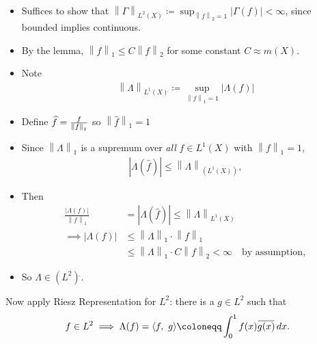 \begin{solution}
\begin{itemize}
\item
  Suffices to show that
  \({\left\lVert {\Gamma} \right\rVert}_{L^2(X) {}^{ \check{} }} \coloneqq\sup_{{\left\lVert {f} \right\rVert}_2 = 1} {\left\lvert {\Gamma(f)} \right\rvert} < \infty\),
  since bounded implies continuous.
\item
  By the lemma,
  \({\left\lVert {f} \right\rVert}_1 \leq C{\left\lVert {f} \right\rVert}_2\)
  for some constant \(C \approx m(X)\).
\item
  Note
  \begin{align*}{\left\lVert {\Lambda} \right\rVert}_{L^1(X) {}^{ \check{} }} \coloneqq\displaystyle\sup_{{\left\lVert {f} \right\rVert}_1 = 1} {\left\lvert {\Lambda(f)} \right\rvert}\end{align*}
\item
  Define \(\widehat{f} = {f\over {\left\lVert {f} \right\rVert}_1}\) so
  \({\left\lVert {\widehat{f}} \right\rVert}_1 = 1\)
\item
  Since \({\left\lVert {\Lambda} \right\rVert}_{1 {}^{ \check{} }}\) is
  a supremum over \emph{all} \(f \in L^1(X)\) with
  \({\left\lVert {f} \right\rVert}_1 =1\),
  \begin{align*}
  {\left\lvert {\Lambda(\widehat{f})} \right\rvert} \leq {\left\lVert {\Lambda} \right\rVert}_{(L^1(X)) {}^{ \check{} }}
  ,\end{align*}
\item
  Then
  \begin{align*}
  \frac{{\left\lvert {\Lambda(f)} \right\rvert}}{{\left\lVert {f} \right\rVert}_1} &= {\left\lvert {\Lambda(\widehat{f})} \right\rvert} \leq {\left\lVert {\Lambda} \right\rVert}_{L^1(X) {}^{ \check{} }} \\
  \implies {\left\lvert {\Lambda(f)} \right\rvert} 
  &\leq {\left\lVert {\Lambda} \right\rVert}_{1 {}^{ \check{} }} \cdot {\left\lVert {f} \right\rVert}_1 \\
  &\leq {\left\lVert {\Lambda} \right\rVert}_{1 {}^{ \check{} }} \cdot C {\left\lVert {f} \right\rVert}_2 < \infty \quad\text{by assumption}
  ,\end{align*}
\item
  So \(\Lambda \in (L^2) {}^{ \check{} }\).
\end{itemize}

Now apply Riesz Representation for \(L^2\): there is a \(g \in L^2\)
such that
\begin{align*}f\in L^2 \implies \Lambda(f) = {\left\langle {f},~{g} \right\rangle} \coloneqq\int_0^1 f(x) \mkern 1.5mu\overline{\mkern-1.5mug(x)\mkern-1.5mu}\mkern 1.5mu\, dx.\end{align*}


\end{solution}
